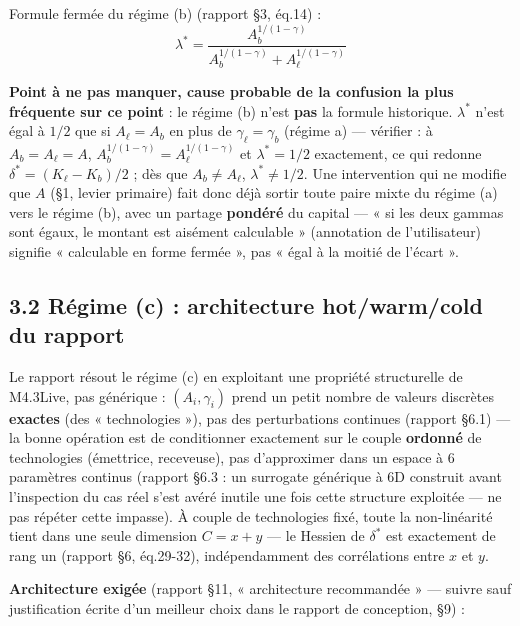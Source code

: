 \documentclass[11pt,a4paper]{article}
\begin{document}
Formule fermée du régime (b) (rapport \S3, éq.14) :
\begin{equation}
\lambda^{*}=\frac{A_b^{1/(1-\gamma)}}{A_b^{1/(1-\gamma)}+A_\ell^{1/(1-\gamma)}}
\label{eq:lambda-star}
\end{equation}

\textbf{Point à ne pas manquer, cause probable de la confusion la plus
fréquente sur ce point} : le régime (b) n'est \textbf{pas} la formule
historique. $\lambda^{*}$ n'est égal à $1/2$ que si $A_\ell=A_b$ en plus
de $\gamma_\ell=\gamma_b$ (régime a) --- vérifier : à $A_b=A_\ell=A$,
$A_b^{1/(1-\gamma)}=A_\ell^{1/(1-\gamma)}$ et $\lambda^{*}=1/2$
exactement, ce qui redonne $\delta^{*}=(K_\ell-K_b)/2$ ; dès que
$A_b\neq A_\ell$, $\lambda^{*}\neq1/2$. Une intervention qui ne modifie
que $A$ (\S1, levier primaire) fait donc déjà sortir toute paire mixte du
régime (a) vers le régime (b), avec un partage \textbf{pondéré} du
capital --- « si les deux gammas sont égaux, le montant est aisément
calculable » (annotation de l'utilisateur) signifie « calculable en forme
fermée », pas « égal à la moitié de l'écart ».

\subsection*{3.2 Régime (c) : architecture hot/warm/cold du rapport}

Le rapport résout le régime (c) en exploitant une propriété structurelle
de M4.3Live, pas générique : $(A_i,\gamma_i)$ prend un petit nombre de
valeurs discrètes \textbf{exactes} (des « technologies »), pas des
perturbations continues (rapport \S6.1) --- la bonne opération est de
conditionner exactement sur le couple \textbf{ordonné} de technologies
(émettrice, receveuse), pas d'approximer dans un espace à 6 paramètres
continus (rapport \S6.3 : un surrogate générique à 6D construit avant
l'inspection du cas réel s'est avéré inutile une fois cette structure
exploitée --- ne pas répéter cette impasse). À couple de technologies
fixé, toute la non-linéarité tient dans une seule dimension $C=x+y$ ---
le Hessien de $\delta^{*}$ est exactement de rang un (rapport \S6,
éq.29-32), indépendamment des corrélations entre $x$ et $y$.

\textbf{Architecture exigée} (rapport \S11, « architecture recommandée »
--- suivre sauf justification écrite d'un meilleur choix dans le rapport
de conception, \S9) :
\end{document}

